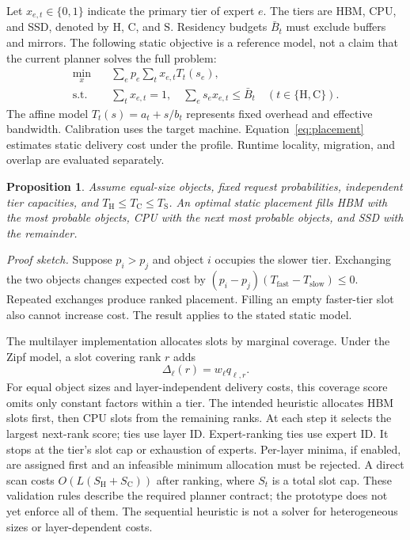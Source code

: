 \documentclass[conference,9pt,letterpaper]{IEEEtran}
\newtheorem{proposition}{Proposition}
\begin{document}
Let $x_{e,t}\in\{0,1\}$ indicate the primary tier of expert $e$. The tiers are HBM, CPU, and SSD, denoted by $\mathrm H$, $\mathrm C$, and $\mathrm S$. Residency budgets $\bar B_t$ must exclude buffers and mirrors. The following static objective is a reference model, not a claim that the current planner solves the full problem:
\begin{align}
 \min_x\quad &\sum_e p_e\sum_t x_{e,t}T_t(s_e),\label{eq:placement}\\
 \text{s.t.}\quad&\sum_t x_{e,t}=1,\quad
 \sum_e s_e x_{e,t}\le \bar B_t\quad(t\in\{\mathrm H,\mathrm C\}).\nonumber
\end{align}
The affine model $T_t(s)=a_t+s/b_t$ represents fixed overhead and effective bandwidth. Calibration uses the target machine. Equation~\ref{eq:placement} estimates static delivery cost under the profile. Runtime locality, migration, and overlap are evaluated separately.

\begin{proposition}
Assume equal-size objects, fixed request probabilities, independent tier capacities, and $T_{\mathrm H}\le T_{\mathrm C}\le T_{\mathrm S}$. An optimal static placement fills HBM with the most probable objects, CPU with the next most probable objects, and SSD with the remainder.
\end{proposition}
\noindent\emph{Proof sketch.} Suppose $p_i>p_j$ and object $i$ occupies the slower tier. Exchanging the two objects changes expected cost by $(p_i-p_j)(T_{\mathrm{fast}}-T_{\mathrm{slow}})\le0$. Repeated exchanges produce ranked placement. Filling an empty faster-tier slot also cannot increase cost. The result applies to the stated static model.

The multilayer implementation allocates slots by marginal coverage. Under the Zipf model, a slot covering rank $r$ adds
\begin{equation}
 \Delta_{\ell}(r)=w_\ell q_{\ell,r}.
\end{equation}
For equal object sizes and layer-independent delivery costs, this coverage score omits only constant factors within a tier. The intended heuristic allocates HBM slots first, then CPU slots from the remaining ranks. At each step it selects the largest next-rank score; ties use layer ID. Expert-ranking ties use expert ID. It stops at the tier's slot cap or exhaustion of experts. Per-layer minima, if enabled, are assigned first and an infeasible minimum allocation must be rejected. A direct scan costs $O(L(S_{\mathrm H}+S_{\mathrm C}))$ after ranking, where $S_t$ is a total slot cap. These validation rules describe the required planner contract; the prototype does not yet enforce all of them. The sequential heuristic is not a solver for heterogeneous sizes or layer-dependent costs.
\end{document}
